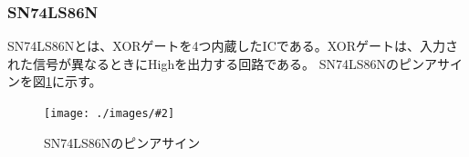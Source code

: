 \documentclass[a4paper,11pt,dvipdfmx]{jsarticle}
\newcommand{\Figure}[4]{
  \begin{figure}[H]
    \centering
    \texttt{[image: ./images/\#2]}
    \caption{#3}
    \label{fig:#4}
  \end{figure}
}
\begin{document}
\subsubsection{SN74LS86N}
SN74LS86Nとは、XORゲートを4つ内蔵したICである。XORゲートは、入力された信号が異なるときにHighを出力する回路である。
SN74LS86Nのピンアサインを図\ref{fig:XOR}に示す。
\Figure{0.4}{74LS86.png}{SN74LS86Nのピンアサイン}{XOR}


\end{document}
